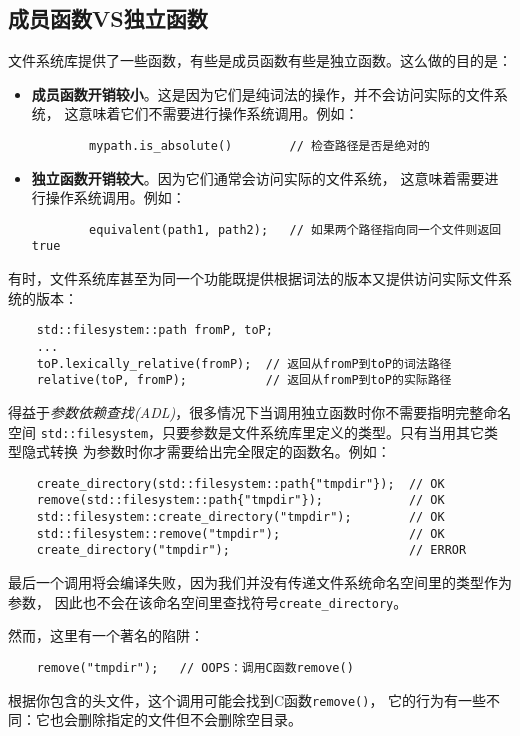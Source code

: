 \subsection{成员函数VS独立函数}
文件系统库提供了一些函数，有些是成员函数有些是独立函数。这么做的目的是：
\begin{itemize}
    \item \textbf{成员函数开销较小}。这是因为它们是纯词法的操作，并不会访问实际的文件系统，
    这意味着它们不需要进行操作系统调用。例如：
    \begin{lstlisting}
        mypath.is_absolute()        // 检查路径是否是绝对的
    \end{lstlisting}
    \item \textbf{独立函数开销较大}。因为它们通常会访问实际的文件系统，
    这意味着需要进行操作系统调用。例如：
    \begin{lstlisting}
        equivalent(path1, path2);   // 如果两个路径指向同一个文件则返回true
    \end{lstlisting}
\end{itemize}
有时，文件系统库甚至为同一个功能既提供根据词法的版本又提供访问实际文件系统的版本：
\begin{lstlisting}
    std::filesystem::path fromP, toP;
    ...
    toP.lexically_relative(fromP);  // 返回从fromP到toP的词法路径
    relative(toP, fromP);           // 返回从fromP到toP的实际路径
\end{lstlisting}
得益于\emph{参数依赖查找(ADL)}，很多情况下当调用独立函数时你不需要指明完整命名空间
\texttt{std::filesystem}，只要参数是文件系统库里定义的类型。只有当用其它类型隐式转换
为参数时你才需要给出完全限定的函数名。例如：\label{ADL导致意外行为}
\begin{lstlisting}
    create_directory(std::filesystem::path{"tmpdir"});  // OK
    remove(std::filesystem::path{"tmpdir"});            // OK
    std::filesystem::create_directory("tmpdir");        // OK
    std::filesystem::remove("tmpdir");                  // OK
    create_directory("tmpdir");                         // ERROR
\end{lstlisting}
最后一个调用将会编译失败，因为我们并没有传递文件系统命名空间里的类型作为参数，
因此也不会在该命名空间里查找符号\texttt{create\_directory}。

然而，这里有一个著名的陷阱：
\begin{lstlisting}
    remove("tmpdir");   // OOPS：调用C函数remove()
\end{lstlisting}
根据你包含的头文件，这个调用可能会找到C函数\texttt{remove()}，
它的行为有一些不同：它也会删除指定的文件但不会删除空目录。

